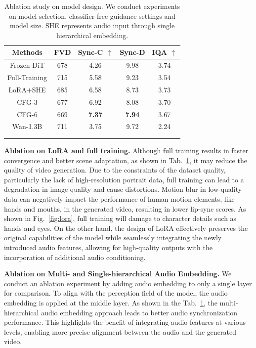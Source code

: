 \begin{table}[t]
\centering
\begin{tabular}{c|cccc}
\Xhline{1pt}
\textbf{Methods} &  \textbf{FVD}     & \textbf{Sync-C}  $\uparrow$  & \textbf{Sync-D}      & \textbf{IQA}  $\uparrow$   \\ \hline
Frozen-DiT & 678 & 4.26 & 9.98 & 3.74  \\
Full-Training & 715 & 5.58 & 9.23 & 3.54  \\
LoRA$+$SHE & 685 & 6.58 & 8.73 & 3.73    \\ \hline
CFG-3 & 677 & 6.92 & 8.08 &  3.70 \\ 
CFG-6 & 669 & \textbf{7.37} & \textbf{7.94} & 3.67 \\ \hline
Wan-1.3B & 711 & 3.75 & 9.72 & 2.24 \\ 
\cellcolor[HTML]{D9D9D9}{Ours} & \cellcolor[HTML]{D9D9D9}{\textbf{664}} & \cellcolor[HTML]{D9D9D9}{7.13} & \cellcolor[HTML]{D9D9D9}{8.05} & \cellcolor[HTML]{D9D9D9}{\textbf{3.75}} \\ \Xhline{1pt}
\end{tabular}
    \vspace{-0.1in}
\caption{Ablation study on model design. We conduct experiments on model selection, classifier-free guidance settings and model size. SHE represents audio input through single hierarchical embedding.}
\vspace{-0.1in}
\label{tab:ablation}
\end{table}


\noindent\textbf{Ablation on LoRA and full training.}
Although full training results in faster convergence and better scene adaptation, as shown in Tab.~\ref{tab:ablation}, it may reduce the quality of video generation. Due to the constraints of the dataset quality, particularly the lack of high-resolution portrait data, full training can lead to a degradation in image quality and cause distortions. Motion blur in low-quality data can negatively impact the performance of human motion elements, like hands and mouths, in the generated video, resulting in lower lip-sync scores. As shown in Fig.~\ref{fig:lora}, full training will damage to character details such as hands and eyes. On the other hand, the design of LoRA effectively preserves the original capabilities of the model while seamlessly integrating the newly introduced audio features, allowing for high-quality outputs with the incorporation of additional audio conditioning.

\noindent\textbf{Ablation on Multi- and Single-hierarchical Audio Embedding.} We conduct an ablation experiment by adding audio embedding to only a single layer for comparison. To align with the perception field of the model, the audio embedding is applied at the middle layer. As shown in the Tab.~\ref{tab:ablation}, the multi-hierarchical audio embedding approach leads to better audio synchronization performance. This highlights the benefit of integrating audio features at various levels, enabling more precise alignment between the audio and the generated video.

